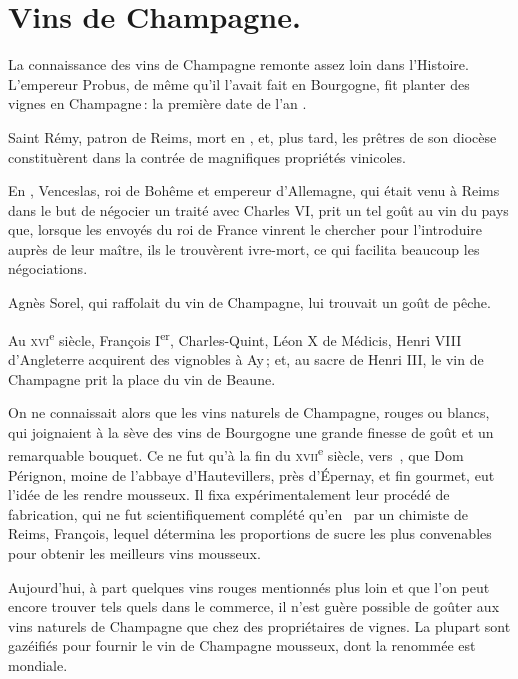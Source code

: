 \section*{\centering Vins de Champagne.}

La connaissance des vins de Champagne remonte assez loin dans l'Histoire.
L'empereur Probus, de même qu'il l'avait fait en Bourgogne, fit planter des
vignes en Champagne : la première date de l'an {\mmm}.

Saint Rémy, patron de Reims, mort en {\mmm}, et, plus tard, les prêtres
de son diocèse constituèrent dans la contrée de magnifiques propriétés
vinicoles.

En {\mmm}, Venceslas, roi de Bohême et empereur d'Allemagne, qui était
venu à Reims dans le but de négocier un traité avec Charles VI, prit un tel
goût au vin du pays que, lorsque les envoyés du roi de France vinrent le
chercher pour l'introduire auprès de leur maître, ils le trouvèrent ivre-mort,
ce qui facilita beaucoup les négociations.

Agnès Sorel, qui raffolait du vin de Champagne, lui trouvait un goût de pêche.

Au \textsc{xvi}\textsuperscript{e} siècle, François I\textsuperscript{er},
Charles-Quint, Léon X de Médicis, Henri VIII d'Angleterre acquirent des
vignobles à Ay ; et, au sacre de Henri III, le vin de Champagne prit la place
du vin de Beaune.

\medskip

On ne connaissait alors que les vins naturels de Champagne, rouges ou blancs,
qui joignaient à la sève des vins de Bourgogne une grande finesse de goût et un
remarquable bouquet. Ce ne fut qu'à la fin du \textsc{xvii}\textsuperscript{e}
siècle, vers {\mmm} {\mmm}, que Dom Pérignon, moine de l'abbaye
d'Hautevillers, près d'Épernay, et fin gourmet, eut l'idée de les rendre
mousseux. Il fixa expérimentalement leur procédé de fabrication, qui ne fut
scientifiquement complété qu'en {\mmm} {\mmm} par un chimiste de
Reims, François, lequel détermina les proportions de sucre les plus convenables
pour obtenir les meilleurs vins mousseux.

Aujourd'hui, à part quelques vins rouges mentionnés plus loin et que l'on peut
encore trouver tels quels dans le commerce, il n'est guère possible de goûter
aux vins naturels de Champagne que chez des propriétaires de vignes. La plupart
sont gazéifiés pour fournir le vin de Champagne mousseux, dont la renommée est
mondiale.

